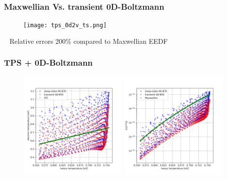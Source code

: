 \documentclass[mathserif, aspectratio=169]{beamer}
\begin{document}
\begin{frame}
	\frametitle{Maxwellian Vs. transient 0D-Boltzmann}
	\begin{figure}
		\begin{center}
			\texttt{[image: tps\_0d2v\_ts.png]}
		\end{center}
	\end{figure}
	\textbullet~ Relative errors 200\% compared to Maxwellian EEDF
\end{frame}

\begin{frame}
	\frametitle{TPS + 0D-Boltzmann}
	\vspace{-0.25in}
	\begin{figure}
		\centering
		\includegraphics[width=0.48\textwidth]{te_vs_tg_tps_bte.png}
		\includegraphics[width=0.48\textwidth]{rates_tps_bte.png}
	\end{figure}
\end{frame}
\end{document}
